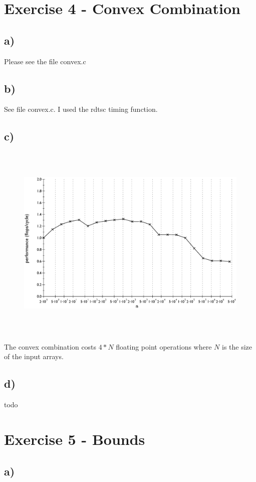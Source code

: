\documentclass[10pt,a4paper,oneside,notitlepage]{report}
\begin{document}
\section*{Exercise 4 - Convex Combination}
\subsection*{a)}
Please see the file convex.c
\subsection*{b)}
See file convex.c. I used the rdtsc timing function.
\subsection*{c)}
\begin{figure}[H]
\caption{}
\includegraphics[height=9.5cm]{convex_performance}
\end{figure}
The convex combination costs $4*N$ floating point operations where $N$ is the size of the input arrays.
\subsection*{d)}
todo

\section*{Exercise 5 - Bounds}
\subsection*{a)}
\end{document}
